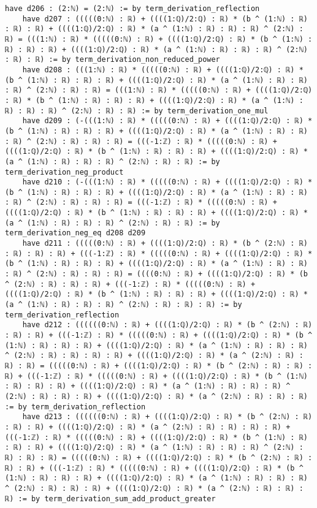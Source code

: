 \documentclass{article}
\begin{document}
\begin{tcolorbox}[colback=white!10, width=\linewidth]
\begin{lstlisting}[language=Lean4]
    have d206 : (2:ℕ) = (2:ℕ) := by term_derivation_reflection
    have d207 : (((((0:ℕ) : ℝ) + ((((1:ℚ)/2:ℚ) : ℝ) * (b ^ (1:ℕ) : ℝ) : ℝ) : ℝ) + ((((1:ℚ)/2:ℚ) : ℝ) * (a ^ (1:ℕ) : ℝ) : ℝ) : ℝ) ^ (2:ℕ) : ℝ) = (((1:ℕ) : ℝ) * (((((0:ℕ) : ℝ) + ((((1:ℚ)/2:ℚ) : ℝ) * (b ^ (1:ℕ) : ℝ) : ℝ) : ℝ) + ((((1:ℚ)/2:ℚ) : ℝ) * (a ^ (1:ℕ) : ℝ) : ℝ) : ℝ) ^ (2:ℕ) : ℝ) : ℝ) := by term_derivation_non_reduced_power
    have d208 : (((1:ℕ) : ℝ) * (((((0:ℕ) : ℝ) + ((((1:ℚ)/2:ℚ) : ℝ) * (b ^ (1:ℕ) : ℝ) : ℝ) : ℝ) + ((((1:ℚ)/2:ℚ) : ℝ) * (a ^ (1:ℕ) : ℝ) : ℝ) : ℝ) ^ (2:ℕ) : ℝ) : ℝ) = (((1:ℕ) : ℝ) * (((((0:ℕ) : ℝ) + ((((1:ℚ)/2:ℚ) : ℝ) * (b ^ (1:ℕ) : ℝ) : ℝ) : ℝ) + ((((1:ℚ)/2:ℚ) : ℝ) * (a ^ (1:ℕ) : ℝ) : ℝ) : ℝ) ^ (2:ℕ) : ℝ) : ℝ) := by term_derivation_one_mul
    have d209 : (-(((1:ℕ) : ℝ) * (((((0:ℕ) : ℝ) + ((((1:ℚ)/2:ℚ) : ℝ) * (b ^ (1:ℕ) : ℝ) : ℝ) : ℝ) + ((((1:ℚ)/2:ℚ) : ℝ) * (a ^ (1:ℕ) : ℝ) : ℝ) : ℝ) ^ (2:ℕ) : ℝ) : ℝ) : ℝ) = (((-1:ℤ) : ℝ) * (((((0:ℕ) : ℝ) + ((((1:ℚ)/2:ℚ) : ℝ) * (b ^ (1:ℕ) : ℝ) : ℝ) : ℝ) + ((((1:ℚ)/2:ℚ) : ℝ) * (a ^ (1:ℕ) : ℝ) : ℝ) : ℝ) ^ (2:ℕ) : ℝ) : ℝ) := by term_derivation_neg_product
    have d210 : (-(((1:ℕ) : ℝ) * (((((0:ℕ) : ℝ) + ((((1:ℚ)/2:ℚ) : ℝ) * (b ^ (1:ℕ) : ℝ) : ℝ) : ℝ) + ((((1:ℚ)/2:ℚ) : ℝ) * (a ^ (1:ℕ) : ℝ) : ℝ) : ℝ) ^ (2:ℕ) : ℝ) : ℝ) : ℝ) = (((-1:ℤ) : ℝ) * (((((0:ℕ) : ℝ) + ((((1:ℚ)/2:ℚ) : ℝ) * (b ^ (1:ℕ) : ℝ) : ℝ) : ℝ) + ((((1:ℚ)/2:ℚ) : ℝ) * (a ^ (1:ℕ) : ℝ) : ℝ) : ℝ) ^ (2:ℕ) : ℝ) : ℝ) := by term_derivation_neg_eq d208 d209
    have d211 : (((((0:ℕ) : ℝ) + ((((1:ℚ)/2:ℚ) : ℝ) * (b ^ (2:ℕ) : ℝ) : ℝ) : ℝ) : ℝ) + (((-1:ℤ) : ℝ) * (((((0:ℕ) : ℝ) + ((((1:ℚ)/2:ℚ) : ℝ) * (b ^ (1:ℕ) : ℝ) : ℝ) : ℝ) + ((((1:ℚ)/2:ℚ) : ℝ) * (a ^ (1:ℕ) : ℝ) : ℝ) : ℝ) ^ (2:ℕ) : ℝ) : ℝ) : ℝ) = ((((0:ℕ) : ℝ) + ((((1:ℚ)/2:ℚ) : ℝ) * (b ^ (2:ℕ) : ℝ) : ℝ) : ℝ) + (((-1:ℤ) : ℝ) * (((((0:ℕ) : ℝ) + ((((1:ℚ)/2:ℚ) : ℝ) * (b ^ (1:ℕ) : ℝ) : ℝ) : ℝ) + ((((1:ℚ)/2:ℚ) : ℝ) * (a ^ (1:ℕ) : ℝ) : ℝ) : ℝ) ^ (2:ℕ) : ℝ) : ℝ) : ℝ) := by term_derivation_reflection
    have d212 : ((((((0:ℕ) : ℝ) + ((((1:ℚ)/2:ℚ) : ℝ) * (b ^ (2:ℕ) : ℝ) : ℝ) : ℝ) + (((-1:ℤ) : ℝ) * (((((0:ℕ) : ℝ) + ((((1:ℚ)/2:ℚ) : ℝ) * (b ^ (1:ℕ) : ℝ) : ℝ) : ℝ) + ((((1:ℚ)/2:ℚ) : ℝ) * (a ^ (1:ℕ) : ℝ) : ℝ) : ℝ) ^ (2:ℕ) : ℝ) : ℝ) : ℝ) : ℝ) + ((((1:ℚ)/2:ℚ) : ℝ) * (a ^ (2:ℕ) : ℝ) : ℝ) : ℝ) = (((((0:ℕ) : ℝ) + ((((1:ℚ)/2:ℚ) : ℝ) * (b ^ (2:ℕ) : ℝ) : ℝ) : ℝ) + (((-1:ℤ) : ℝ) * (((((0:ℕ) : ℝ) + ((((1:ℚ)/2:ℚ) : ℝ) * (b ^ (1:ℕ) : ℝ) : ℝ) : ℝ) + ((((1:ℚ)/2:ℚ) : ℝ) * (a ^ (1:ℕ) : ℝ) : ℝ) : ℝ) ^ (2:ℕ) : ℝ) : ℝ) : ℝ) + ((((1:ℚ)/2:ℚ) : ℝ) * (a ^ (2:ℕ) : ℝ) : ℝ) : ℝ) := by term_derivation_reflection
    have d213 : ((((((0:ℕ) : ℝ) + ((((1:ℚ)/2:ℚ) : ℝ) * (b ^ (2:ℕ) : ℝ) : ℝ) : ℝ) + ((((1:ℚ)/2:ℚ) : ℝ) * (a ^ (2:ℕ) : ℝ) : ℝ) : ℝ) : ℝ) + (((-1:ℤ) : ℝ) * (((((0:ℕ) : ℝ) + ((((1:ℚ)/2:ℚ) : ℝ) * (b ^ (1:ℕ) : ℝ) : ℝ) : ℝ) + ((((1:ℚ)/2:ℚ) : ℝ) * (a ^ (1:ℕ) : ℝ) : ℝ) : ℝ) ^ (2:ℕ) : ℝ) : ℝ) : ℝ) = (((((0:ℕ) : ℝ) + ((((1:ℚ)/2:ℚ) : ℝ) * (b ^ (2:ℕ) : ℝ) : ℝ) : ℝ) + (((-1:ℤ) : ℝ) * (((((0:ℕ) : ℝ) + ((((1:ℚ)/2:ℚ) : ℝ) * (b ^ (1:ℕ) : ℝ) : ℝ) : ℝ) + ((((1:ℚ)/2:ℚ) : ℝ) * (a ^ (1:ℕ) : ℝ) : ℝ) : ℝ) ^ (2:ℕ) : ℝ) : ℝ) : ℝ) + ((((1:ℚ)/2:ℚ) : ℝ) * (a ^ (2:ℕ) : ℝ) : ℝ) : ℝ) := by term_derivation_sum_add_product_greater

\end{lstlisting}
\end{tcolorbox}
\end{document}
